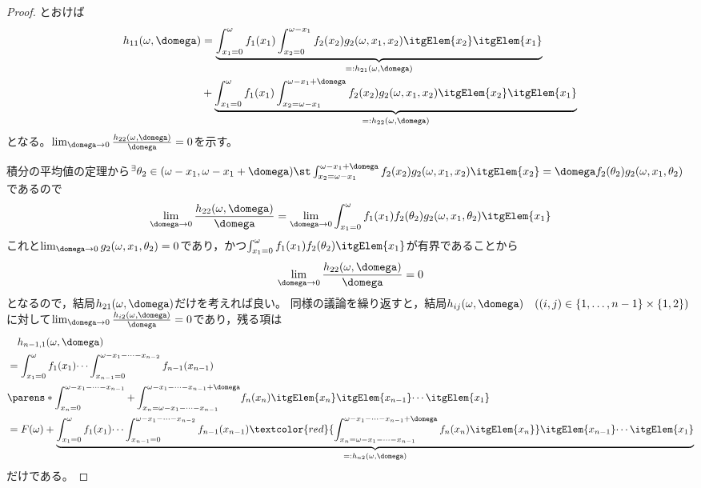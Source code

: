\begin{proof}
            とおけば
            \begin{align*}
                h_{11}(\omega,\domega) &= \underbrace{\int_{x_1=0}^\omega f_1(x_1)\int_{x_2=0}^{\omega-x_1}f_2(x_2)g_2(\omega,x_1,x_2)\itgElem{x_2}\itgElem{x_1}}_{=:h_{21}(\omega,\domega)} \\
                &+ \underbrace{\int_{x_1=0}^\omega f_1(x_1)\int_{x_2=\omega-x_1}^{\omega-x_1+\domega}f_2(x_2)g_2(\omega,x_1,x_2)\itgElem{x_2}\itgElem{x_1}}_{=:h_{22}(\omega,\domega)}
            \end{align*}
            となる。$\lim_{\domega\to 0}\frac{h_{22}(\omega,\domega)}{\domega} = 0$を示す。
            \par
            積分の平均値の定理から$^\exists\theta_2\in(\omega-x_1,\omega-x_1+\domega)\st\int_{x_2=\omega-x_1}^{\omega-x_1+\domega}f_2(x_2)g_2(\omega,x_1,x_2)\itgElem{x_2} = \domega f_2(\theta_2)g_2(\omega,x_1,\theta_2)$であるので
            \[\lim_{\domega\to 0}\frac{h_{22}(\omega,\domega)}{\domega} = \lim_{\domega\to 0}\int_{x_1=0}^\omega f_1(x_1)f_2(\theta_2)g_2(\omega,x_1,\theta_2)\itgElem{x_1}\]
            これと$\lim_{\domega\to 0}g_2(\omega,x_1,\theta_2)=0$であり，かつ$\int_{x_1=0}^\omega f_1(x_1)f_2(\theta_2)\itgElem{x_1}$が有界であることから
            \[\lim_{\domega\to 0}\frac{h_{22}(\omega,\domega)}{\domega} = 0\]
            となるので，結局$h_{21}(\omega,\domega)$だけを考えれば良い。
            同様の議論を繰り返すと，結局$h_{ij}(\omega,\domega)\quad((i,j)\in\{1,\dotsc,n-1\}\times\{1,2\})$に対して$\lim_{\domega\to 0}\frac{h_{i2}(\omega,\domega)}{\domega}=0$であり，残る項は
            \begin{align*}
                &\quad h_{n-1,1}(\omega,\domega) \\
                &= \int_{x_1=0}^{\omega}f_1(x_1)\dotsi\int_{x_{n-1}=0}^{\omega-x_1-\dotsb-x_{n-2}}f_{n-1}(x_{n-1}) \\
                & \parens*{\int_{x_n=0}^{\omega-x_1-\dotsb-x_{n-1}}+\int_{x_n=\omega-x_1-\dotsb-x_{n-1}}^{\omega-x_1-\dotsb-x_{n-1}+\domega}}f_n(x_n)\itgElem{x_n}\itgElem{x_{n-1}}\dotsi\itgElem{x_1} \\
                &= F(\omega) + \underbrace{\int_{x_1=0}^{\omega}f_1(x_1)\dotsi\int_{x_{n-1}=0}^{\omega-x_1-\dotsb-x_{n-2}}f_{n-1}(x_{n-1})\textcolor{red}{\int_{x_n=\omega-x_1-\dotsb-x_{n-1}}^{\omega-x_1-\dotsb-x_{n-1}+\domega}f_n(x_n)\itgElem{x_n}}\itgElem{x_{n-1}}\dotsi\itgElem{x_1}}_{=:h_{n2}(\omega,\domega)}
            \end{align*}
            だけである。
            \par

\end{proof}
